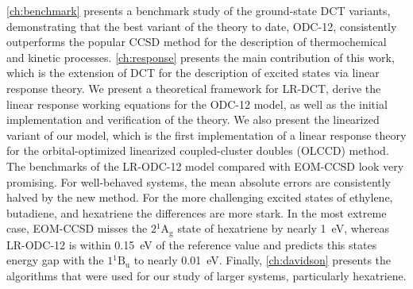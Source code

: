 \cref{ch:benchmark} presents a benchmark study of the ground-state DCT variants,
demonstrating that the best variant of the theory to date, ODC-12, consistently
outperforms the popular CCSD method for the description of thermochemical and
kinetic processes.
\cref{ch:response} presents the main contribution of this work, which is the
extension of DCT for the description of excited states via linear response
theory.
We present a theoretical framework for LR-DCT, derive the linear response
working equations for the ODC-12 model, as well as the initial implementation
and verification of the theory.
We also present the linearized variant of our model, which is the first
implementation of a linear response theory for the orbital-optimized linearized
coupled-cluster doubles (OLCCD) method.
The benchmarks of the LR-ODC-12 model compared with EOM-CCSD look very
promising.
For well-behaved systems, the mean absolute errors are consistently halved by
the new method.
For the more challenging excited states of ethylene, butadiene, and hexatriene
the differences are more stark.
In the most extreme case, EOM-CCSD misses the \(2{}^1\mathrm{A_g}\) state of
hexatriene by nearly 1~eV, whereas LR-ODC-12 is within 0.15~eV of the reference
value and predicts this states energy gap with the \(1{}^1\mathrm{B_u}\) to
nearly 0.01~eV.
Finally, \cref{ch:davidson} presents the algorithms that were used for our study
of larger systems, particularly hexatriene.
